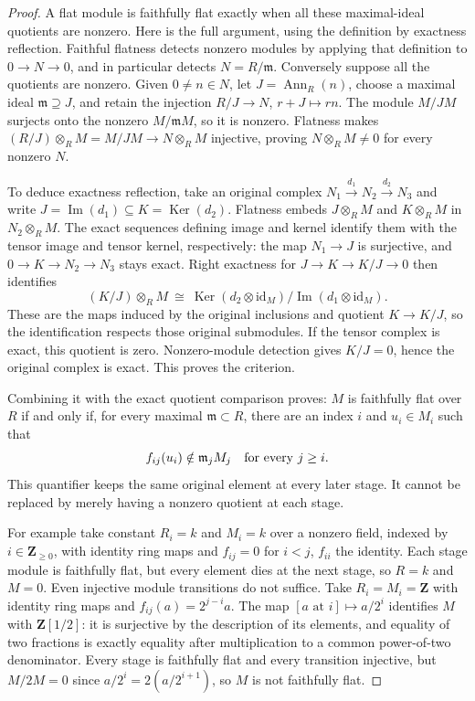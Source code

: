 \begin{proof}
A flat module is faithfully flat exactly when all these
maximal-ideal quotients are nonzero. Here is the full
argument, using the definition by exactness reflection.
Faithful flatness detects nonzero modules by applying that
definition to $0\to N\to0$, and in particular detects
$N=R/\mathfrak m$. Conversely suppose all the quotients
are nonzero. Given $0\ne n\in N$, let
$J=\operatorname{Ann}_R(n)$, choose a maximal ideal
$\mathfrak m\supseteq J$, and retain the injection
$R/J\to N$, $r+J\mapsto rn$. The module $M/JM$ surjects
onto the nonzero $M/\mathfrak mM$, so it is nonzero.
Flatness makes $(R/J)\otimes_R M=M/JM\to N\otimes_R M$
injective, proving $N\otimes_R M\ne0$ for every nonzero $N$.

To deduce exactness reflection, take an original complex
$N_1\xrightarrow{d_1}N_2\xrightarrow{d_2}N_3$ and write
$J=\operatorname{Im}(d_1)\subseteq K=\operatorname{Ker}(d_2)$.
Flatness embeds $J\otimes_R M$ and $K\otimes_R M$ in
$N_2\otimes_R M$. The exact sequences defining image and
kernel identify them with the tensor image and tensor
kernel, respectively: the map $N_1\to J$ is surjective,
and $0\to K\to N_2\to N_3$ stays exact. Right exactness
for $J\to K\to K/J\to0$ then identifies
$$
(K/J)\otimes_R M\ \cong\
\operatorname{Ker}(d_2\otimes\mathrm{id}_M)\big/
\operatorname{Im}(d_1\otimes\mathrm{id}_M).
$$
These are the maps induced by the original inclusions and
quotient $K\to K/J$, so the identification respects those
original submodules. If the tensor complex is exact, this
quotient is zero. Nonzero-module detection gives $K/J=0$,
hence the original complex is exact. This proves the criterion.

Combining it with the exact quotient comparison proves:
$M$ is faithfully flat over $R$ if and only if, for every
maximal $\mathfrak m\subset R$, there are an index $i$ and
$u_i\in M_i$ such that
$$
f_{ij}(u_i)\notin\mathfrak m_jM_j
\quad\hbox{for every }j\geq i.
$$
This quantifier keeps the same original element at every
later stage. It cannot be replaced by merely having a
nonzero quotient at each stage.

For example take constant $R_i=k$ and $M_i=k$ over a
nonzero field, indexed by $i\in\mathbf Z_{\geq0}$, with
identity ring maps and $f_{ij}=0$ for $i<j$, $f_{ii}$ the
identity. Each stage module is faithfully flat, but every
element dies at the next stage, so $R=k$ and $M=0$.
Even injective module transitions do not suffice. Take
$R_i=M_i=\mathbf Z$ with identity ring maps and
$f_{ij}(a)=2^{j-i}a$. The map $[a\text{ at }i]\mapsto a/2^i$
identifies $M$ with $\mathbf Z[1/2]$: it is surjective by
the description of its elements, and equality of two
fractions is exactly equality after multiplication to a
common power-of-two denominator. Every stage is faithfully
flat and every transition injective, but $M/2M=0$ since
$a/2^i=2(a/2^{i+1})$, so $M$ is not faithfully flat.


\end{proof}
